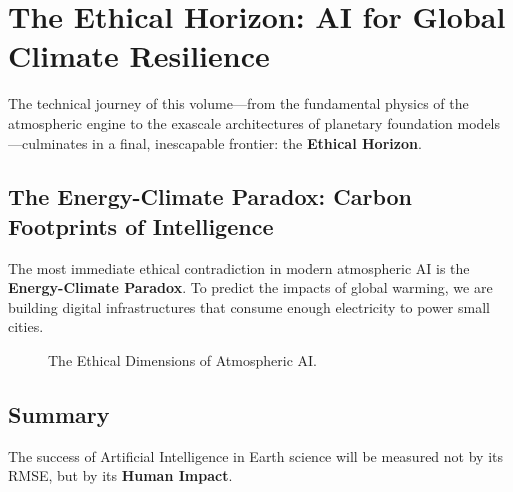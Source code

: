 \chapter{The Ethical Horizon: AI for Global Climate Resilience}

The technical journey of this volume—from the fundamental physics of the atmospheric engine to the exascale architectures of planetary foundation models—culminates in a final, inescapable frontier: the \textbf{Ethical Horizon}. 

\section{The Energy-Climate Paradox: Carbon Footprints of Intelligence}

The most immediate ethical contradiction in modern atmospheric AI is the \textbf{Energy-Climate Paradox}. To predict the impacts of global warming, we are building digital infrastructures that consume enough electricity to power small cities. 

\begin{figure}[H]
\centering
{}
\caption{The Ethical Dimensions of Atmospheric AI.}
\label{fig:ethics_tikz}
\end{figure}

\section{Summary}
The success of Artificial Intelligence in Earth science will be measured not by its RMSE, but by its \textbf{Human Impact}.
